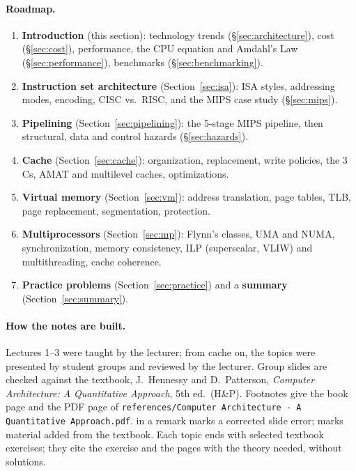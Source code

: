 \paragraph{Roadmap.}
\begin{enumerate}
  \item \textbf{Introduction} (this section): technology trends
  (\S\ref{sec:architecture}), cost (\S\ref{sec:cost}), performance, the CPU
  equation and Amdahl's Law (\S\ref{sec:performance}), benchmarks
  (\S\ref{sec:benchmarking}).
  \item \textbf{Instruction set architecture} (Section~\ref{sec:isa}): ISA
  styles, addressing modes, encoding, CISC vs.\ RISC, and the MIPS case study
  (\S\ref{sec:mips}).
  \item \textbf{Pipelining} (Section~\ref{sec:pipelining}): the 5-stage MIPS
  pipeline, then structural, data and control hazards (\S\ref{sec:hazards}).
  \item \textbf{Cache} (Section~\ref{sec:cache}): organization, replacement,
  write policies, the 3 Cs, AMAT and multilevel caches, optimizations.
  \item \textbf{Virtual memory} (Section~\ref{sec:vm}): address translation,
  page tables, TLB, page replacement, segmentation, protection.
  \item \textbf{Multiprocessors} (Section~\ref{sec:mp}): Flynn's classes, UMA
  and NUMA, synchronization, memory consistency, ILP (superscalar, VLIW) and
  multithreading, cache coherence.
  \item \textbf{Practice problems} (Section~\ref{sec:practice}) and a
  \textbf{summary} (Section~\ref{sec:summary}).
\end{enumerate}

\paragraph{How the notes are built.} Lectures 1--3 were taught by the lecturer;
from cache on, the topics were presented by student groups and reviewed by the
lecturer. Group slides are checked against the textbook, J.~Hennessy and
D.~Patterson, \emph{Computer Architecture: A Quantitative Approach}, 5th ed.\
(H\&P). Footnotes give the book page and the PDF page of
\texttt{references/Computer Architecture - A Quantitative Approach.pdf}.
\slidefix{} in a remark marks a corrected slide error; \beyond{} marks material
added from the textbook. Each topic ends with selected textbook exercises; they
cite the exercise and the pages with the theory needed, without solutions.

